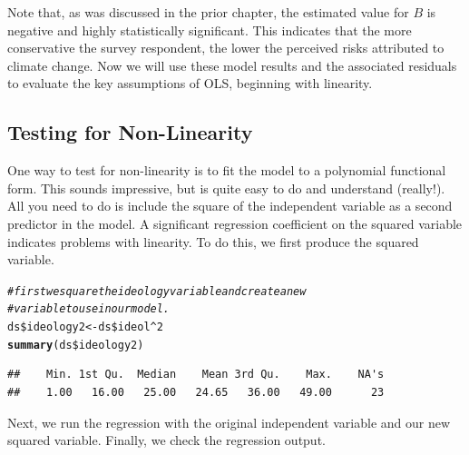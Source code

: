 \documentclass[11pt,openany]{book}\usepackage[]{graphicx}\usepackage[]{color}
\makeatletter
\newcommand{\hlnum}[1]{\textcolor[rgb]{0.686,0.059,0.569}{#1}}%
\newcommand{\hlcom}[1]{\textcolor[rgb]{0.678,0.584,0.686}{\textit{#1}}}%
\newcommand{\hlopt}[1]{\textcolor[rgb]{0,0,0}{#1}}%
\newcommand{\hlstd}[1]{\textcolor[rgb]{0.345,0.345,0.345}{#1}}%
\newcommand{\hlkwb}[1]{\textcolor[rgb]{0.69,0.353,0.396}{#1}}%
\newcommand{\hlkwd}[1]{\textcolor[rgb]{0.737,0.353,0.396}{\textbf{#1}}}%
\newenvironment{kframe}{%
 \def\at@end@of@kframe{}%
 \ifinner\ifhmode%
  \def\at@end@of@kframe{\end{minipage}}%
  \begin{minipage}{\columnwidth}%
 \fi\fi%
 \def\FrameCommand##1{\hskip\@totalleftmargin \hskip-\fboxsep
 \colorbox{shadecolor}{##1}\hskip-\fboxsep
     \hskip-\linewidth \hskip-\@totalleftmargin \hskip\columnwidth}%
 \MakeFramed {\advance\hsize-\width
   \@totalleftmargin\z@ \linewidth\hsize
   \@setminipage}}%
 {\par\unskip\endMakeFramed%
 \at@end@of@kframe}
\newenvironment{knitrout}{}{} %
\renewenvironment{knitrout}{\begin{singlespace}}{\end{singlespace}}
\makeatother
\begin{document}
Note that, as was discussed in the prior chapter, the estimated value for $B$ is negative and highly statistically significant. This indicates that the more conservative the survey respondent, the lower the perceived risks attributed to climate change. Now we will use these model results and the associated residuals to evaluate the key assumptions of OLS, beginning with linearity. 

\subsection{Testing for Non-Linearity}
One way to test for non-linearity is to fit the model to a polynomial functional form. This sounds impressive, but is quite easy to do and understand (really!). All you need to do is include the square of the independent variable as a second predictor in the model.  A significant regression coefficient on the squared variable indicates problems with linearity. To do this, we first produce the squared variable.

\begin{knitrout}
\color{fgcolor}\begin{kframe}
\begin{alltt}
\hlcom{# first we square the ideology variable and create a new}
\hlcom{# variable to use in our model.}
\hlstd{ds}\hlopt{\$}\hlstd{ideology2} \hlkwb{<-} \hlstd{ds}\hlopt{\$}\hlstd{ideol}\hlopt{^}\hlnum{2}
\hlkwd{summary}\hlstd{(ds}\hlopt{\$}\hlstd{ideology2)}
\end{alltt}
\begin{verbatim}
##    Min. 1st Qu.  Median    Mean 3rd Qu.    Max.    NA's 
##    1.00   16.00   25.00   24.65   36.00   49.00      23
\end{verbatim}
\end{kframe}
\end{knitrout}

\noindent Next, we run the regression with the original independent variable and our new squared variable.  Finally, we check the regression output.
\end{document}
